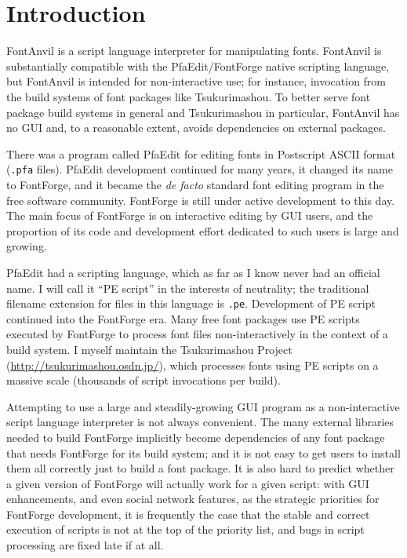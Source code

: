 \documentclass[11pt]{report}
\begin{document}
\tableofcontents

\clearpage


\chapter{Introduction}

FontAnvil is a script language interpreter for manipulating fonts. 
FontAnvil is substantially compatible with the PfaEdit/FontForge native
scripting language, but FontAnvil is intended for non-interactive use; for
instance, invocation from the build systems of font packages like
Tsukurimashou.  To better serve font package build systems in general and
Tsukurimashou in particular, FontAnvil has no GUI and, to a reasonable
extent, avoids dependencies on external packages.

There was a program called PfaEdit for editing fonts in Postscript ASCII
format (\texttt{.pfa} files).  PfaEdit development continued for many years,
it changed its name to FontForge, and it became the \emph{de facto} standard
font editing program in the free software community.  FontForge is still
under active development to this day.  The main focus of FontForge is on
interactive editing by GUI users, and the proportion of its code and
development effort dedicated to such users is large and growing.

PfaEdit had a scripting language, which as far as I know never had an
official name.  I will call it ``PE script'' in the interests of neutrality;
the traditional filename extension for files in this language is
\texttt{.pe}.  Development of PE script continued into the FontForge era. 
Many free font packages use PE scripts executed by FontForge to process font
files non-interactively in the context of a build system.  I myself maintain
the Tsukurimashou Project (\url{http://tsukurimashou.osdn.jp/}),
which processes fonts using PE scripts on a massive scale (thousands of
script invocations per build).

Attempting to use a large and steadily-growing GUI program as a
non-interactive script language interpreter is not always convenient.  The
many external libraries needed to build FontForge implicitly become
dependencies of any font package that needs FontForge for its build system;
and it is not easy to get users to install them all correctly just to build
a font package.  It is also hard to predict whether a given version of
FontForge will actually work for a given script: with GUI enhancements, and
even social network features, as the strategic priorities for FontForge
development, it is frequently the case that the stable and correct execution
of scripts is not at the top of the priority list, and bugs in script
processing are fixed late if at all.
\end{document}
